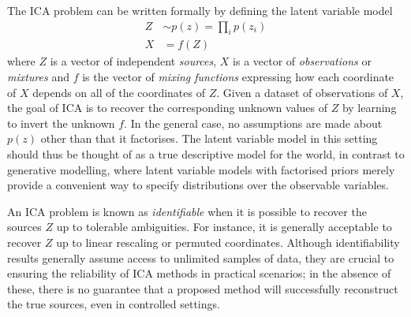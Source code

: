 The ICA problem can be written formally by defining the 
latent variable model
%
\begin{align}
Z &\sim p(z) = \prod_i p(z_i) \label{eqn:ica-basic-1} \\
X &= f(Z) \label{eqn:ica-basic-2}
\end{align}
%
where $Z$ is a vector of independent \emph{sources}, $X$ is a vector of \emph{observations} or \emph{mixtures} and $f$ is the vector of \emph{mixing functions} expressing how each coordinate of $X$ depends on all of the coordinates of $Z$. 
Given a dataset of observations of $X$, the goal of ICA is to recover the corresponding unknown values of $Z$ by learning to invert the unknown $f$.
In the general case, no assumptions are made about $p(z)$ other than that it factorises.
The latent variable model in this setting should thus be thought of as a true descriptive model for the world, 
in contrast to generative modelling, where latent variable models with factorised priors merely provide a convenient way to specify distributions over the observable variables. 



An ICA problem is known as \emph{identifiable} when it is possible to recover the sources $Z$ up to tolerable ambiguities. 
For instance, it is generally acceptable to recover $Z$ up to linear rescaling or permuted coordinates.
Although identifiability results generally assume access to unlimited samples of data, they are crucial to ensuring the reliability of ICA methods in practical scenarios; in the absence of these, there is no guarantee that a proposed method will successfully reconstruct the true sources, even in controlled settings.

